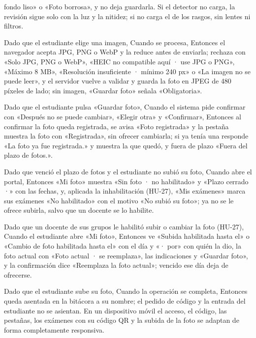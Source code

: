 {      fondo liso» o «Foto borrosa», y no deja guardarla. Si el detector no carga, la
      revisión sigue solo con la luz y la nitidez; si no carga el de los rasgos, sin
      lentes ni filtros.
\item Dado que el estudiante elige una imagen, Cuando se procesa, Entonces el navegador
      acepta JPG, PNG o WebP y la reduce antes de enviarla; rechaza con «Solo JPG, PNG o
      WebP», «HEIC no compatible aquí · use JPG o PNG», «Máximo 8 MB», «Resolución
      insuficiente · mínimo 240 px» o «La imagen no se puede leer», y el servidor vuelve
      a validar y guarda la foto en JPEG de 480 píxeles de lado; sin imagen, «Guardar
      foto» señala «Obligatoria».
\item Dado que el estudiante pulsa «Guardar foto», Cuando el sistema pide confirmar con
      «Después no se puede cambiar», «Elegir otra» y «Confirmar», Entonces al confirmar
      la foto queda registrada, se avisa «Foto registrada» y la pestaña muestra la foto
      con «Registrada», sin ofrecer cambiarla; si ya tenía una responde «La foto ya fue
      registrada.» y muestra la que quedó, y fuera de plazo «Fuera del plazo de fotos.».
\item Dado que venció el plazo de fotos y el estudiante no subió su foto, Cuando abre
      el portal, Entonces «Mi foto» muestra «Sin foto · no habilitado» y «Plazo cerrado
      ·» con las fechas, y, aplicada la inhabilitación (HU-27), «Mis exámenes» marca sus
      exámenes «No habilitado» con el motivo «No subió su foto»; ya no se le ofrece
      subirla, salvo que un docente se lo habilite.
\item Dado que un docente de sus grupos le habilitó subir o cambiar la foto (HU-27),
      Cuando el estudiante abre «Mi foto», Entonces ve «Subida habilitada hasta el» o
      «Cambio de foto habilitada hasta el» con el día y «· por» con quién la dio, la
      foto actual con «Foto actual · se reemplaza», las indicaciones y «Guardar foto», y
      la confirmación dice «Reemplaza la foto actual»; vencido ese día deja de
      ofrecerse.
\item Dado que el estudiante sube su foto, Cuando la operación se completa, Entonces
      queda asentada en la bitácora a su nombre; el pedido de código y la entrada del
      estudiante no se asientan. En un dispositivo móvil el acceso, el código, las
      pestañas, los exámenes con su código QR y la subida de la foto se adaptan de forma completamente
      responsiva.}

\def\HUMockupsPares{%
\CajaMockup{hu26-acceso-del-estudiante}{10.6cm} & \CajaMockup{hu26-acceso-del-estudiante-movil}{3.2cm} \\[4pt]
\hline
\CajaMockup{hu26-codigo-de-acceso}{10.6cm} & \CajaMockup{hu26-codigo-de-acceso-movil}{3.2cm} \\[4pt]
\hline
\CajaMockup{hu26-subir-foto}{10.6cm} & \CajaMockup{hu26-subir-foto-movil}{3.2cm} \\[4pt]
\hline
\CajaMockup{hu26-sin-foto-no-habilitado}{10.6cm} & \CajaMockup{hu26-sin-foto-no-habilitado-movil}{3.2cm} \\[4pt]
\hline}


